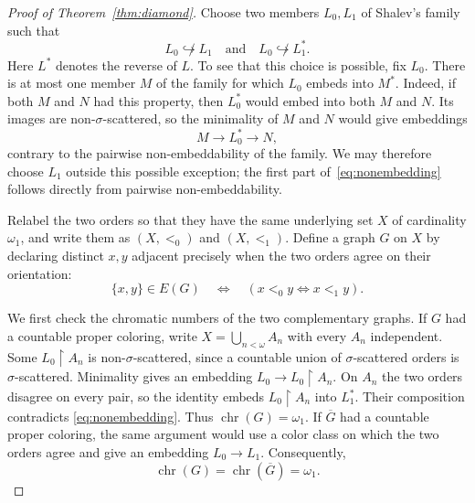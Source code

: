 \documentclass[10pt,a4paper]{amsart}
\numberwithin{equation}{section}
\theoremstyle{definition}
\theoremstyle{remark}
\newcommand{\chr}{\operatorname{chr}}
\newcommand{\restr}{\mathbin{\upharpoonright}}
\begin{document}
\begin{proof}[Proof of Theorem~\ref{thm:diamond}]
Choose two members $L_0,L_1$ of Shalev's family such that
\begin{equation}\label{eq:nonembedding}
 L_0\not\hookrightarrow L_1
 \quad\text{and}\quad
 L_0\not\hookrightarrow L_1^*.
\end{equation}
Here $L^*$ denotes the reverse of $L$.  To see that this choice is
possible, fix $L_0$.  There is at most one member $M$ of the
family for which $L_0$ embeds into $M^*$.  Indeed, if both $M$ and
$N$ had this property, then $L_0^*$ would embed into both $M$ and
$N$.  Its images are non-$\sigma$-scattered, so the minimality of
$M$ and $N$ would give embeddings
\begin{displaymath}
 M\longrightarrow L_0^*\longrightarrow N,
\end{displaymath}
contrary to the pairwise non-embeddability of the family.  We may
therefore choose $L_1$ outside this possible exception; the first part
of~\eqref{eq:nonembedding} follows directly from pairwise
non-embeddability.

Relabel the two orders so that they have the same underlying set $X$
of cardinality $\omega_1$, and write them as $(X,<_{0})$ and
$(X,<_{1})$.  Define a graph $G$ on $X$ by declaring distinct $x,y$
adjacent precisely when the two orders agree on their orientation:
\begin{equation}\label{eq:edge-definition}
 \{x,y\}\in E(G)
 \quad\Longleftrightarrow\quad
 (x<_{0}y\Longleftrightarrow x<_{1}y).
\end{equation}

We first check the chromatic numbers of the two complementary graphs.
If $G$ had a countable proper coloring, write $X=\bigcup_{n<\omega}A_n$
with every $A_n$ independent.  Some $L_0\restr A_n$ is
non-$\sigma$-scattered, since a countable union of
$\sigma$-scattered orders is $\sigma$-scattered.  Minimality gives
an embedding $L_0\longrightarrow L_0\restr A_n$.  On $A_n$ the two
orders disagree on every pair, so the identity embeds
$L_0\restr A_n$ into $L_1^*$.  Their composition contradicts
\eqref{eq:nonembedding}.
Thus $\chr(G)=\omega_1$.  If $\overline G$ had a countable proper
coloring, the same argument would use a color class on which the two
orders agree and give an embedding $L_0\longrightarrow L_1$.
Consequently,
\begin{equation}\label{eq:factor-chromatic-numbers}
 \chr(G)=\chr(\overline G)=\omega_1.
\end{equation}


\end{proof}
\end{document}
